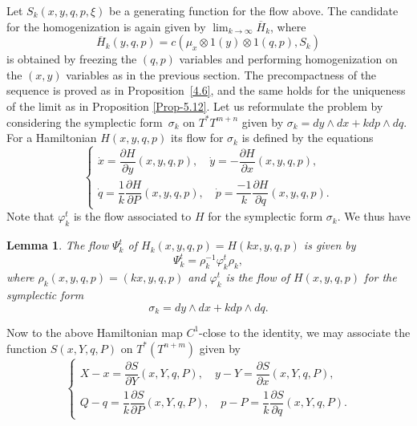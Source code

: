 \documentclass[JEP,XML,SOM,NoFloatCountersInSection,Unicode,published]{cedram}
\numberwithin{equation}{section}
\theoremstyle{plain}
\newtheorem{lemma}[theorem]{Lemma}
\theoremstyle{definition}
\theoremstyle{remark}
\begin{document}
Let $S_{k}(x,y,q,p, \xi)$ be a generating function for the flow above. The candidate for the homogenization is again given by $ \lim_{k \to \infty}\overline H_{k}$, where
\[
\overline{H}_{k}(y,q,p) = c(\mu_{x}\otimes 1(y)\otimes 1(q,p), S_{k})
\]
is obtained by freezing the $(q,p)$ variables and performing homogenization on the $(x,y)$ variables as in the previous section.
The precompactness of the sequence is proved as in Proposition~\ref{4.6}, and the same holds for the uniqueness of the limit as in Proposition \ref{Prop-5.12}.
Let us reformulate the problem by considering the symplectic form~$\sigma_{k}$ on $T^*T^{m+n}$ given by $\sigma_k=dy\wedge dx +k dp\wedge dq$. For a Hamiltonian $H(x,y,q,p)$ its flow for $\sigma_k$ is defined by the equations
\[
\begin{cases}
\dot x= \dfrac{\partial H}{\partial y}(x,y,q,p),\quad \dot y= -\dfrac{\partial H}{\partial x}(x,y,q,p), \\[8pt] \dot q=\dfrac{1}{k} \dfrac{\partial H}{\partial P}(x,y,q,p), \quad \dot p= \dfrac{-1}{k}\dfrac{\partial H}{\partial q}(x,y,q,p).
\end{cases}
\]
Note that $\varphi_k^t$ is the flow associated to $H$ for the symplectic form $\sigma_k$. We thus have
\begin{lemma} \label{Lemma-10.1}
The flow $\Psi_k^t$ of $H_k(x,y,q,p)=H(kx,y,q,p)$ is given by
\[
\Psi_k^t= \rho_k^{-1}\varphi_k^t\rho_k,
\]
where $\rho_k(x,y,q,p)=(kx, y,q,p)$ and $\varphi_k^t$ is the flow of $H(x,y,q,p)$ for the symplectic form
\[
\sigma_k=dy\wedge dx +k dp\wedge dq.
\]
\end{lemma}
Now to the above Hamiltonian map $C^{1}$-close to the identity, we may associate the function $S(x,Y,q,P)$ on $T^*(T^{n+m})$ given by
\[
\begin{cases}
X-x=\dfrac{\partial S}{\partial Y}(x,Y,q,P), \quad y-Y= \dfrac{\partial S}{\partial x}(x,Y,q,P), \\[8pt] Q-q=\dfrac{1}{k} \dfrac{\partial S}{\partial P}(x,Y,q,P), \quad p-P= \dfrac{1}{k}\dfrac{\partial S}{\partial q}(x,Y,q,P).\end{cases}
\]
\end{document}
